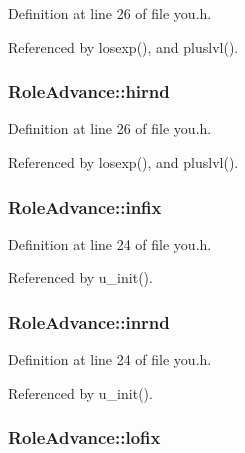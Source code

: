 Definition at line 26 of file you.\+h.



Referenced by losexp(), and pluslvl().

\hypertarget{structRoleAdvance_a6132e0002a06dea2c67661308488772f}{
\subsubsection[{hirnd}]{ Role\+Advance\+::hirnd}}\label{structRoleAdvance_a6132e0002a06dea2c67661308488772f}


Definition at line 26 of file you.\+h.



Referenced by losexp(), and pluslvl().

\hypertarget{structRoleAdvance_a0756b60368efde4ff5738c291d96b02f}{
\subsubsection[{infix}]{ Role\+Advance\+::infix}}\label{structRoleAdvance_a0756b60368efde4ff5738c291d96b02f}


Definition at line 24 of file you.\+h.



Referenced by u\+\_\+init().

\hypertarget{structRoleAdvance_adf36de29ced4989b180e963326151fb3}{
\subsubsection[{inrnd}]{ Role\+Advance\+::inrnd}}\label{structRoleAdvance_adf36de29ced4989b180e963326151fb3}


Definition at line 24 of file you.\+h.



Referenced by u\+\_\+init().

\hypertarget{structRoleAdvance_ac38bf662d53d443f26f8c65775e39f12}{
\subsubsection[{lofix}]{ Role\+Advance\+::lofix}}\label{structRoleAdvance_ac38bf662d53d443f26f8c65775e39f12}


